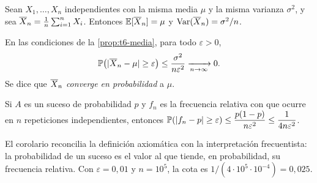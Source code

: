 \begin{proposicion}\label{prop:t6-media}
Sean $X_1,\dots,X_n$ independientes con la misma media $\mu$ y la misma varianza $\sigma^{2}$, y sea $\overline{X}_n=\frac1n\sum_{i=1}^{n}X_i$. Entonces $\mathbb{E}[\overline{X}_n]=\mu$ y $\operatorname{Var}(\overline{X}_n)=\sigma^{2}/n$.
\end{proposicion}

\begin{teorema}\label{teo:t6-lgn}
En las condiciones de la \cref{prop:t6-media}, para todo $\varepsilon>0$,
\[
\mathbb{P}\bigl(\lvert\overline{X}_n-\mu\rvert\ge\varepsilon\bigr)\le\frac{\sigma^{2}}{n\varepsilon^{2}}\xrightarrow[n\to\infty]{}0.
\]
Se dice que $\overline{X}_n$ \emph{converge en probabilidad} a $\mu$.
\end{teorema}

\begin{corolario}\label{cor:t6-frecuencias}
Si $A$ es un suceso de probabilidad $p$ y $f_n$ es la frecuencia relativa con que ocurre en $n$ repeticiones independientes, entonces $\mathbb{P}(\lvert f_n-p\rvert\ge\varepsilon)\le\dfrac{p(1-p)}{n\varepsilon^{2}}\le\dfrac{1}{4n\varepsilon^{2}}$.
\end{corolario}

El corolario reconcilia la definición axiomática con la interpretación frecuentista: la probabilidad de un suceso es el valor al que tiende, en probabilidad, su frecuencia relativa. Con $\varepsilon=0{,}01$ y $n=10^{5}$, la cota es $1/(4\cdot10^{5}\cdot10^{-4})=0{,}025$.

\addtocounter{definicion}{1}%

\addtocounter{definicion}{1}%

